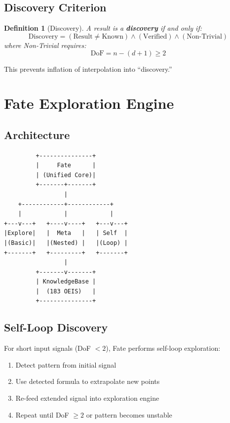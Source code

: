\documentclass[11pt,a4paper]{article}
\newtheorem{definition}{Definition}
\begin{document}
\subsection{Discovery Criterion}

\begin{definition}[Discovery]
A result is a \textbf{discovery} if and only if:
\[
\text{Discovery} = (\text{Result} \neq \text{Known}) \land (\text{Verified}) 
\land (\text{Non-Trivial})
\]
where Non-Trivial requires:
\[
\text{DoF} = n - (d + 1) \geq 2
\]
\end{definition}

This prevents inflation of interpolation into ``discovery.''

\section{Fate Exploration Engine}

\subsection{Architecture}

\begin{verbatim}
         +---------------+
         |     Fate      |
         | (Unified Core)|
         +-------+-------+
                 |
    +------------+------------+
    |            |            |
+---v---+   +----v----+   +---v---+
|Explore|   |  Meta   |   | Self  |
|(Basic)|   |(Nested) |   |(Loop) |
+-------+   +---------+   +-------+
                 |
         +-------v-------+
         | KnowledgeBase |
         |  (183 OEIS)   |
         +---------------+
\end{verbatim}

\subsection{Self-Loop Discovery}

For short input signals (DoF $< 2$), Fate performs self-loop exploration:
\begin{enumerate}
    \item Detect pattern from initial signal
    \item Use detected formula to extrapolate new points
    \item Re-feed extended signal into exploration engine
    \item Repeat until DoF $\geq 2$ or pattern becomes unstable
\end{enumerate}
\end{document}
